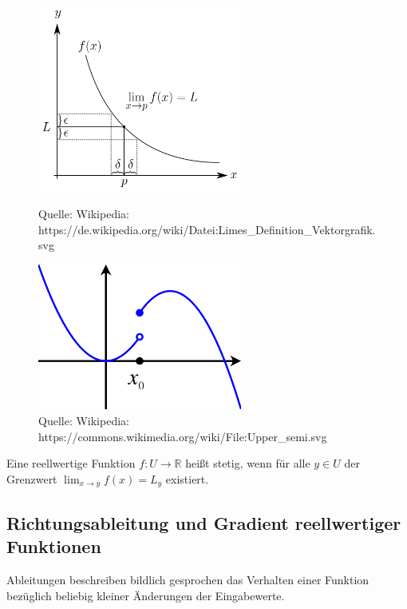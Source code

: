 \begin{figure}[H]
      \centering
    \includegraphics[width=0.6\textwidth]{images/500px-Limes_Definition_Vektorgrafik}
      \caption{Quelle: Wikipedia: https://de.wikipedia.org/wiki/Datei:Limes\_Definition\_Vektorgrafik.svg}
    \includegraphics[width=0.6\textwidth]{images/500px-Upper_semi}
      \caption{Quelle: Wikipedia: https://commons.wikimedia.org/wiki/File:Upper\_semi.svg}
\end{figure}




\begin{Definition}
Eine reellwertige Funktion $f :U \to \mathbb{R}$ heißt stetig, wenn für alle $y \in U$ der Grenzwert $\lim_{x \to y} f(x) = L_{y} $ existiert.
\end{Definition}


\subsection{Richtungsableitung und Gradient reellwertiger Funktionen}
Ableitungen beschreiben bildlich gesprochen das Verhalten einer Funktion bezüglich beliebig kleiner Änderungen der Eingabewerte.






